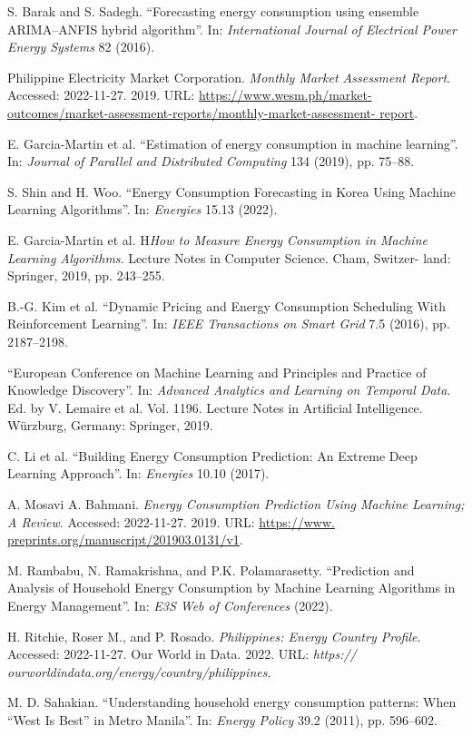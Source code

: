\documentclass[runningheads]{llncs}
\begin{document}
%
%
%
% 
% 
%
\begin{thebibliography}{15}
S. Barak and S. Sadegh. “Forecasting energy consumption using ensemble ARIMA–ANFIS hybrid algorithm”. In: \textit{International Journal of Electrical Power Energy Systems} 82 (2016).

Philippine Electricity Market Corporation. \textit{Monthly Market Assessment Report}. Accessed: 2022-11-27. 2019. URL: \url{https://www.wesm.ph/market- outcomes/market-assessment-reports/monthly-market-assessment- report}.

E. Garcia-Martin et al. “Estimation of energy consumption in machine learning”. In: \textit{Journal of Parallel and Distributed Computing} 134 (2019), pp. 75–88.

S. Shin and H. Woo. “Energy Consumption Forecasting in Korea Using Machine Learning Algorithms”. In: \textit{Energies} 15.13 (2022).

E. Garcia-Martin et al. H\textit{How to Measure Energy Consumption in Machine Learning Algorithms}. Lecture Notes in Computer Science. Cham, Switzer- land: Springer, 2019, pp. 243–255.

B.-G. Kim et al. “Dynamic Pricing and Energy Consumption Scheduling With Reinforcement Learning”. In: \textit{IEEE Transactions on Smart Grid} 7.5 (2016), pp. 2187–2198.

“European Conference on Machine Learning and Principles and Practice of Knowledge Discovery”. In: \textit{Advanced Analytics and Learning on Temporal Data}. Ed. by V. Lemaire et al. Vol. 1196. Lecture Notes in Artificial Intelligence. Würzburg, Germany: Springer, 2019.

C. Li et al. “Building Energy Consumption Prediction: An Extreme Deep Learning Approach”. In: \textit{Energies} 10.10 (2017).

A. Mosavi A. Bahmani. \textit{Energy Consumption Prediction Using Machine Learning; A Review}. Accessed: 2022-11-27. 2019. URL: \url{https://www. preprints.org/manuscript/201903.0131/v1}.

M. Rambabu, N. Ramakrishna, and P.K. Polamarasetty. “Prediction and Analysis of Household Energy Consumption by Machine Learning Algorithms in Energy Management”. In: \textit{E3S Web of Conferences} (2022).

H. Ritchie, Roser M., and P. Rosado. \textit{Philippines: Energy Country Profile}. Accessed: 2022-11-27. Our World in Data. 2022. URL: \textit{https:// ourworldindata.org/energy/country/philippines}.

M. D. Sahakian. “Understanding household energy consumption patterns: When “West Is Best” in Metro Manila”. In: \textit{Energy Policy} 39.2 (2011), pp. 596–602.

\end{thebibliography}
\end{document}
